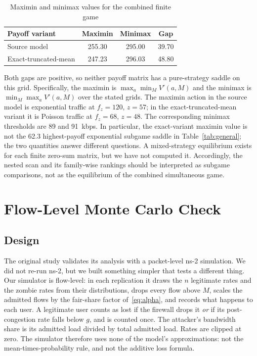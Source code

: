 \documentclass[conference]{IEEEtran}
\begin{document}
\begin{table}[t]
\caption{Maximin and minimax values for the combined finite game}
\label{tab:fullgame}
\centering\scriptsize
\begin{tabular}{lccc}
\toprule
Payoff variant & Maximin & Minimax & Gap\\
\midrule
Source model & 255.30 & 295.00 & 39.70\\
Exact-truncated-mean & 247.23 & 296.03 & 48.80\\
\bottomrule
\end{tabular}
\end{table}

Both gaps are positive, so neither payoff matrix has a pure-strategy saddle on this grid. Specifically, the maximin is $\max_a\min_M V'(a,M)$ and the minimax is $\min_M\max_a V'(a,M)$ over the stated grids. The maximin action in the source model is exponential traffic at $f_z{=}120$, $z{=}57$; in the exact-truncated-mean variant it is Poisson traffic at $f_z{=}68$, $z{=}48$. The corresponding minimax thresholds are 89 and 91~kbps. In particular, the exact-variant maximin value is not the 62.3 highest-payoff exponential subgame saddle in Table~\ref{tab:general}; the two quantities answer different questions. A mixed-strategy equilibrium exists for each finite zero-sum matrix, but we have not computed it. Accordingly, the nested scan and its family-wise rankings should be interpreted as subgame comparisons, not as the equilibrium of the combined simultaneous game.

\section{Flow-Level Monte Carlo Check}\label{sec:mc}

\subsection{Design}
The original study validates its analysis with a packet-level ns-2 simulation. We did not re-run ns-2, but we built something simpler that tests a different thing. Our simulator is flow-level: in each replication it draws the $n$ legitimate rates and the zombie rates from their distributions, drops every flow above $M$, scales the admitted flows by the fair-share factor of~\eqref{eq:alpha}, and records what happens to each user. A legitimate user counts as lost if the firewall drops it \emph{or} if its post-congestion rate falls below $g$, and is counted once. The attacker's bandwidth share is its admitted load divided by total admitted load. Rates are clipped at zero. The simulator therefore uses none of the model's approximations: not the mean-times-probability rule, and not the additive loss formula.
\end{document}
